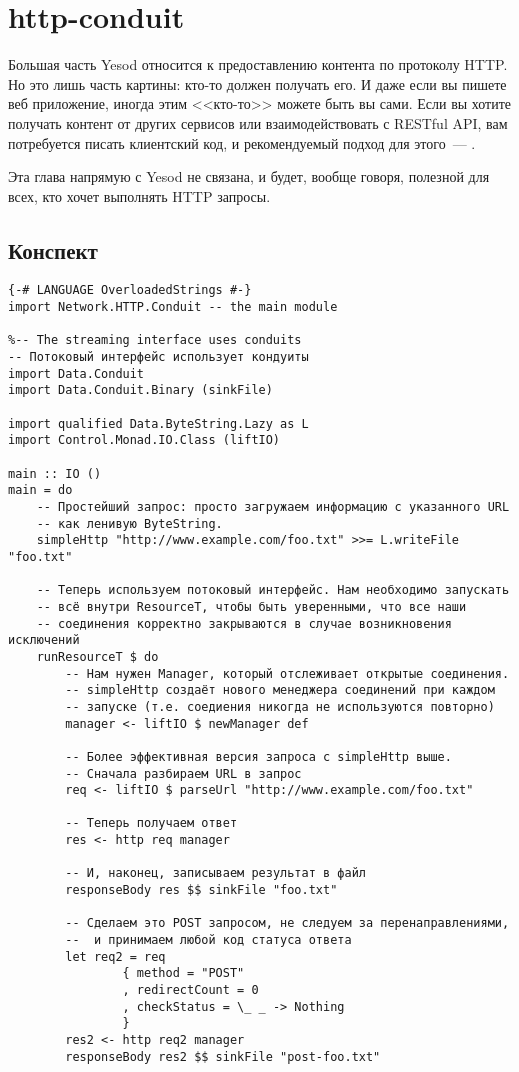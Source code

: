 \chapter{http-conduit}
Большая часть Yesod относится к предоставлению контента по протоколу
HTTP. Но это лишь часть картины: кто-то должен получать его. И даже
если вы пишете веб приложение, иногда этим <<кто-то>> можете быть вы
сами. Если вы хотите получать контент от других сервисов или
взаимодействовать с RESTful API, вам потребуется писать
клиентский код, и рекомендуемый подход для этого~---
.

Эта глава напрямую с Yesod не связана, и будет, вообще говоря, полезной для
всех, кто хочет выполнять HTTP запросы.

\section{Конспект}
\begin{lstlisting}
{-# LANGUAGE OverloadedStrings #-}
import Network.HTTP.Conduit -- the main module

%-- The streaming interface uses conduits
-- Потоковый интерфейс использует кондуиты
import Data.Conduit
import Data.Conduit.Binary (sinkFile)

import qualified Data.ByteString.Lazy as L
import Control.Monad.IO.Class (liftIO)

main :: IO ()
main = do
    -- Простейший запрос: просто загружаем информацию с указанного URL
    -- как ленивую ByteString.
    simpleHttp "http://www.example.com/foo.txt" >>= L.writeFile "foo.txt"

    -- Теперь используем потоковый интерфейс. Нам необходимо запускать
    -- всё внутри ResourceT, чтобы быть уверенными, что все наши
    -- соединения корректно закрываются в случае возникновения исключений
    runResourceT $ do
        -- Нам нужен Manager, который отслеживает открытые соединения.
        -- simpleHttp создаёт нового менеджера соединений при каждом
        -- запуске (т.е. соедиения никогда не используются повторно)
        manager <- liftIO $ newManager def

        -- Более эффективная версия запроса с simpleHttp выше.
        -- Сначала разбираем URL в запрос
        req <- liftIO $ parseUrl "http://www.example.com/foo.txt"

        -- Теперь получаем ответ
        res <- http req manager

        -- И, наконец, записываем результат в файл
        responseBody res $$ sinkFile "foo.txt"

        -- Сделаем это POST запросом, не следуем за перенаправлениями,
        --  и принимаем любой код статуса ответа
        let req2 = req
                { method = "POST"
                , redirectCount = 0
                , checkStatus = \_ _ -> Nothing
                }
        res2 <- http req2 manager
        responseBody res2 $$ sinkFile "post-foo.txt"
\end{lstlisting} %

